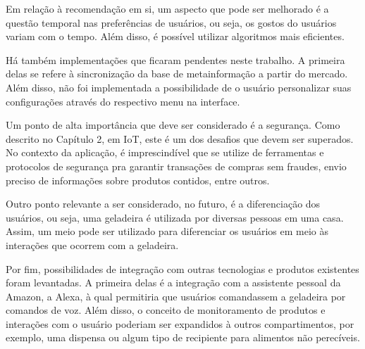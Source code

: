 Em relação à recomendação em si, um aspecto que pode ser melhorado é a questão temporal nas preferências de usuários, ou seja, os gostos do usuários variam com o tempo. Além disso, é possível utilizar algoritmos mais eficientes.

Há também implementações que ficaram pendentes neste trabalho. A primeira delas se refere à sincronização da base de metainformação a partir do mercado. Além disso, não foi implementada a possibilidade de o usuário personalizar suas configurações através do respectivo menu na interface.


Um ponto de alta importância que deve ser considerado é a segurança. Como descrito no Capítulo 2, em IoT, este é um dos desafios que devem ser superados. No contexto da aplicação, é imprescindível que se utilize de ferramentas e protocolos de segurança pra garantir transações de compras sem fraudes, envio preciso de informações sobre produtos contidos, entre outros.

Outro ponto relevante a ser considerado, no futuro, é a diferenciação dos usuários, ou seja, uma geladeira é utilizada por diversas pessoas em uma casa. Assim, um meio pode ser utilizado para diferenciar os usuários em meio às interações que ocorrem com a geladeira.

Por fim, possibilidades de integração com outras tecnologias e produtos existentes foram levantadas. A primeira delas é a integração com a assistente pessoal da Amazon\textsuperscript{\textregistered}, a Alexa\textsuperscript{\textregistered}, à qual permitiria que  usuários comandassem a geladeira por comandos de voz. Além disso, o conceito de monitoramento de produtos e interações com o usuário poderiam ser expandidos à outros compartimentos, por exemplo, uma dispensa ou algum tipo de recipiente para alimentos não perecíveis. 






